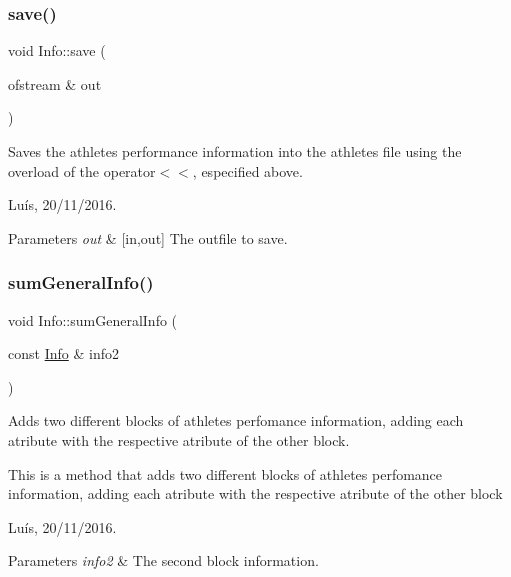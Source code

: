 \hypertarget{class_info_a7b18f01c7cef1a219d3adb6677f3475f}{}\label{class_info_a7b18f01c7cef1a219d3adb6677f3475f} 
\subsubsection{\texorpdfstring{save()}{save()}}
{\footnotesize\ttfamily void Info\+::save (\begin{DoxyParamCaption}\item[{ofstream \&}]{out }\end{DoxyParamCaption})\hspace{0.3cm}{\ttfamily [virtual]}}



Saves the athlete\textquotesingle{}s performance information into the athlete\textquotesingle{}s file using the overload of the operator$<$$<$, especified above. 

Luís, 20/11/2016. 


\begin{DoxyParams}{Parameters}
{\em out} & \mbox{[}in,out\mbox{]} The outfile to save. \\
\hline
\end{DoxyParams}
\hypertarget{class_info_a9c2e39f8cfbe6d070d1154313fe0dd2e}{}\label{class_info_a9c2e39f8cfbe6d070d1154313fe0dd2e} 
\subsubsection{\texorpdfstring{sum\+General\+Info()}{sumGeneralInfo()}}
{\footnotesize\ttfamily void Info\+::sum\+General\+Info (\begin{DoxyParamCaption}\item[{const \hyperlink{class_info}{Info} \&}]{info2 }\end{DoxyParamCaption})}



Adds two different blocks of athlete\textquotesingle{}s perfomance information, adding each atribute with the respective atribute of the other block. 

This is a method that adds two different blocks of athlete\textquotesingle{}s perfomance information, adding each atribute with the respective atribute of the other block

Luís, 20/11/2016. 


\begin{DoxyParams}{Parameters}
{\em info2} & The second block information. \\
\hline
\end{DoxyParams}


